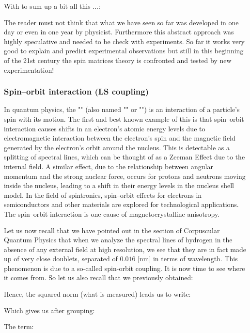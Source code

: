 	With to sum up a bit all this ...:
	
	The reader must not think that what we have seen so far was developed in one day or even in one year by physicist. Furthermore this abstract approach was highly speculative and needed to be check with experiments. So far it works very good to explain and predict experimental observations but still in this beginning of the 21st century the spin matrices theory is confronted and tested by new experimentation!
	
	\pagebreak
	\subsubsection{Spin–orbit interaction (LS coupling)}
	In quantum physics, the "" (also named ""  or "") is an interaction of a particle's spin with its motion. The first and best known example of this is that spin–orbit interaction causes shifts in an electron's atomic energy levels due to electromagnetic interaction between the electron's spin and the magnetic field generated by the electron's orbit around the nucleus. This is detectable as a splitting of spectral lines, which can be thought of as a Zeeman Effect due to the internal field. A similar effect, due to the relationship between angular momentum and the strong nuclear force, occurs for protons and neutrons moving inside the nucleus, leading to a shift in their energy levels in the nucleus shell model. In the field of spintronics, spin–orbit effects for electrons in semiconductors and other materials are explored for technological applications. The spin–orbit interaction is one cause of magnetocrystalline anisotropy.
	
	Let us now recall that we have pointed out in the section of Corpuscular Quantum Physics that when we analyze the spectral lines of hydrogen in the absence of any external field at high resolution, we see that they are in fact made up of very close doublets, separated of $0.016$ [nm] in terms of wavelength. This phenomenon is due to a so-called spin-orbit coupling. It is now time to see where it comes from. So let us also recall that we previously obtained:
	
	Hence, the squared norm (what is measured) leads us to write:
	
	Which gives us after grouping:
	
	The term:
	
